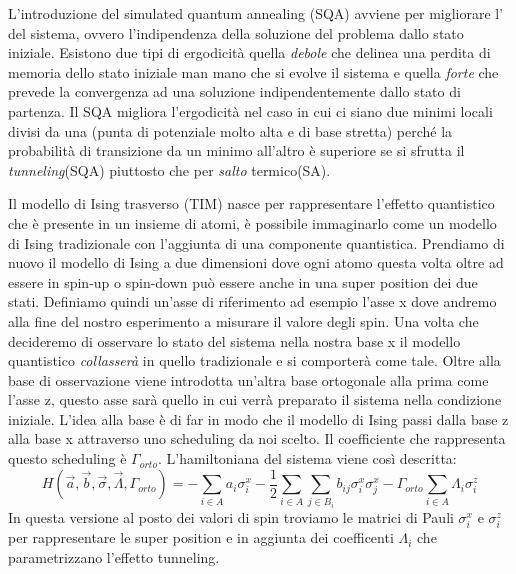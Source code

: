 \cite{QA}L'introduzione del simulated quantum annealing (SQA) avviene per migliorare l' del sistema, ovvero l'indipendenza della soluzione del problema dallo stato iniziale. Esistono due tipi di ergodicità quella \textit{debole} che delinea una perdita di memoria dello stato iniziale man mano che si evolve il sistema e quella \textit{forte} che prevede la convergenza ad una soluzione indipendentemente dallo stato di partenza. Il SQA migliora l'ergodicità nel caso in cui ci siano due minimi locali divisi da una  (punta di potenziale molto alta e di base stretta) perché la probabilità di transizione da un minimo all'altro è superiore se si sfrutta il \textit{tunneling}(SQA) piuttosto che per \textit{salto} termico(SA).

\cite{QA}Il modello di Ising trasverso (TIM) nasce per rappresentare l'effetto quantistico che è presente in un insieme di atomi, è possibile immaginarlo come un modello di Ising tradizionale con l'aggiunta di una componente quantistica. Prendiamo di nuovo il modello di Ising a due dimensioni dove ogni atomo questa volta oltre ad essere in spin-up o spin-down può essere anche in una super position dei due stati. Definiamo quindi un'asse di riferimento ad esempio l'asse x dove andremo alla fine del nostro esperimento a misurare il valore degli spin. Una volta che decideremo di osservare lo stato del sistema nella nostra base x il modello quantistico \textit{collasserà} in quello tradizionale e si comporterà come tale. Oltre alla base di osservazione viene introdotta un'altra base ortogonale alla prima come l'asse z, questo asse sarà quello in cui verrà preparato il sistema nella condizione iniziale. L'idea alla base è di far in modo che il modello di Ising passi dalla base z alla base x attraverso uno scheduling da noi scelto. Il coefficiente che rappresenta questo scheduling è $\Gamma_{orto}$. L'hamiltoniana del sistema viene così descritta:
$$ H(\vec{a}, \vec{b}, \vec{\sigma}, \vec{\Lambda}, \Gamma_{orto}) = - \sum_{i \in A } a_i \sigma^x_i - \frac{1}{2} \sum_{i \in A} \sum_{j \in B_i} b_{ij} \sigma^x_i \sigma^x_j - \Gamma_{orto} \sum_{i \in A } \Lambda_i \sigma^z_i$$
In questa versione al posto dei valori di spin troviamo le matrici di Pauli $\sigma^x_i$ e $\sigma^z_i$ per rappresentare le super position e in aggiunta dei coefficenti $\Lambda_i$ che parametrizzano l'effetto tunneling.

